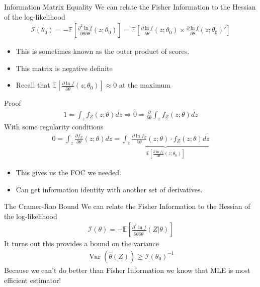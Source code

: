 \begin{frame}{Information Matrix Equality}
We can relate the \alert{Fisher Information} to the Hessian of the log-likelihood
\begin{align*}
\mathcal { I } \left( \theta _ { 0 } \right) = - \mathbb { E } \left[ \frac { \partial ^ { 2 } \ln f } { \partial \theta \partial \theta } \left( z ; \theta _ { 0 } \right) \right] 
= \mathbb { E } \left[ \frac { \partial \ln f } { \partial \theta } \left( z ; \theta _ { 0 } \right) \times \frac { \partial \ln f } { \partial \theta  } \left( z ; \theta _ { 0 } \right)' \right]
\end{align*}
\begin{itemize}
    \item This is sometimes known as the \alert{outer product of scores}.
    \item This matrix is \alert{negative definite}
    \item Recall that $ \mathbb { E } \left[ \frac { \partial \ln f } { \partial \theta } \left( z ; \theta _ { 0 } \right) \right]\approx 0$ at the maximum
\end{itemize}
\end{frame}


\begin{frame}{Proof}
\begin{align*}
1 = \int _ { z } f _ { Z } ( z ; \theta ) d z \Rightarrow 0 = \frac { \partial } { \partial \theta } \int _ { z } f _ { Z } ( z ; \theta ) d z
\end{align*}
With some regularity conditions
\begin{align*}
0 = \int _ { z } \frac { \partial f _ { Z } } { \partial \theta } ( z ; \theta ) d z = \underbrace{\int _ { z } \frac { \partial \ln f _ { Z } } { \partial \theta } ( z ; \theta ) \cdot f _ { Z } ( z ; \theta ) d z}_{\mathbb { E } \left[ \frac { \partial \ln f _ { Z } } { \partial \theta } \left( z ; \theta _ { 0 } \right) \right]}
\end{align*}

\begin{itemize}
    \item This gives us the FOC we needed.
    \item Can get information identity with another set of derivatives.
    \end{itemize}
\end{frame}


\begin{frame}{The Cramer-Rao Bound}
We can relate the \alert{Fisher Information} to the Hessian of the log-likelihood
\begin{align*}
\mathcal { I } ( \theta ) = - \mathbb { E } \left[ \frac { \partial ^ { 2 } \ln f } { \partial \theta \partial \theta ^ { \prime } } ( Z | \theta ) \right]
\end{align*}
It turns out this provides a bound on the variance
\begin{align*}
\operatorname { Var } ( \hat { \theta } ( Z ) ) \geq \mathcal { I } \left( \theta _ { 0 } \right) ^ { - 1 }
\end{align*}
Because we can't do better than Fisher Information we know that MLE is most efficient estimator!
\end{frame}

